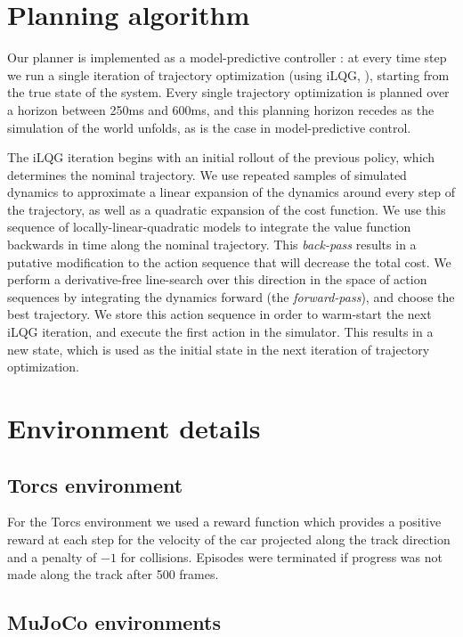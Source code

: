 \documentclass{article} %
\begin{document}
\section{Planning algorithm}
Our planner is implemented as a model-predictive controller
\citep{tassa2012synthesis}: at every time step we run a single iteration of
trajectory optimization (using iLQG, \citep{todorov2005generalized}), starting
from the true state of the system.
Every single trajectory optimization is planned over a horizon between
250ms and 600ms, and this planning horizon recedes as the simulation of
the world unfolds, as is the case in model-predictive control.

The iLQG iteration begins with an initial rollout of the previous
policy, which determines the nominal trajectory.  We use repeated
samples of simulated dynamics to approximate a linear expansion of the
dynamics around every step of the trajectory, as well as a quadratic
expansion of the cost function.  We use this sequence of
locally-linear-quadratic models to integrate the value function
backwards in time along the nominal trajectory.  This \emph{back-pass}
results in a putative modification to the action sequence that will
decrease the total cost.  We perform a derivative-free line-search
over this direction in the space of action sequences by integrating
the dynamics forward (the \emph{forward-pass}), and choose the best
trajectory.  We store this action sequence in order to warm-start the
next iLQG iteration, and execute the first action in the simulator.
This results in a new state, which is used as the initial state in the
next iteration of trajectory optimization.
\section{Environment details}


\subsection{Torcs environment}

For the Torcs environment we used a reward function
which provides a positive reward at each step for the velocity
of the car projected along the track direction and a penalty
of $-1$ for collisions. Episodes were terminated
if progress was not made along the track after 500
frames.


\subsection{MuJoCo environments}
\end{document}
